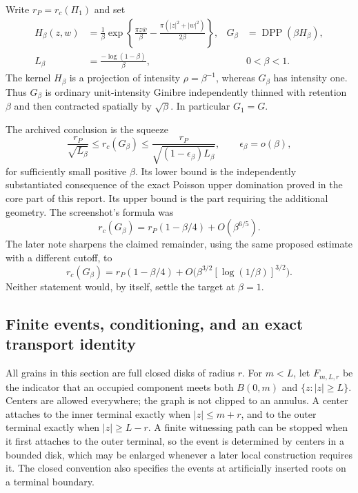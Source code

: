 \documentclass[11pt,a4paper]{article}
\theoremstyle{definition}
\theoremstyle{remark}
\numberwithin{equation}{section}
\begin{document}
Write $r_P=r_c(\Pi_1)$ and set
\begin{align}
 H_\beta(z,w)
 &=\frac1\beta\exp\left\{\frac{\pi z\overline w}{\beta}
       -\frac{\pi(|z|^2+|w|^2)}{2\beta}\right\},
 &G_\beta&=\operatorname{DPP}(\beta H_\beta),
 \label{sb:kernel}\\
 L_\beta&=\frac{-\log(1-\beta)}\beta,
 &&0<\beta<1.\label{sb:L}
\end{align}
The kernel $H_\beta$ is a projection of intensity $\rho=\beta^{-1}$,
whereas $G_\beta$ has intensity one. Thus $G_\beta$ is ordinary
unit-intensity Ginibre independently thinned with retention $\beta$ and
then contracted spatially by $\sqrt\beta$. In particular $G_1=G$.

The archived conclusion is the squeeze
\begin{equation}
 \frac{r_P}{\sqrt{L_\beta}}
 \le r_c(G_\beta)
 \le \frac{r_P}{\sqrt{(1-\epsilon_\beta)L_\beta}},
 \qquad \epsilon_\beta=o(\beta),
 \label{sb:squeeze}
\end{equation}
for sufficiently small positive $\beta$. Its lower bound is the
independently substantiated consequence of the exact Poisson upper
domination proved in the core part of this report. Its upper bound is
the part requiring the additional geometry. The screenshot's formula
was
\begin{equation}
 r_c(G_\beta)=r_P(1-\beta/4)+O(\beta^{6/5}).
 \label{sb:old-asymptotic}
\end{equation}
The later note sharpens the claimed remainder, using the same proposed
estimate with a different cutoff, to
\begin{equation}
 r_c(G_\beta)=r_P(1-\beta/4)
    +O\bigl(\beta^{3/2}[\log(1/\beta)]^{3/2}\bigr).
 \label{sb:new-asymptotic}
\end{equation}
Neither statement would, by itself, settle the target at $\beta=1$.

\subsection{Finite events, conditioning, and an exact transport identity}

All grains in this section are full closed disks of radius $r$. For
$m<L$, let $F_{m,L,r}$ be the indicator that an occupied component meets
both $B(0,m)$ and $\{z:|z|\ge L\}$. Centers are allowed everywhere;
the graph is not clipped to an annulus. A center attaches to the inner
terminal exactly when $|z|\le m+r$, and to the outer terminal exactly
when $|z|\ge L-r$. A finite witnessing path can be stopped when it
first attaches to the outer terminal, so the event is determined by
centers in a bounded disk, which may be enlarged whenever a later local
construction requires it. The closed convention also specifies the
events at artificially inserted roots on a terminal boundary.
\end{document}
